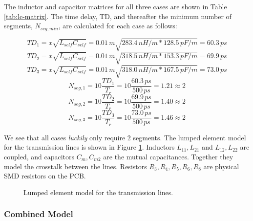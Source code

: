\documentclass[../main.tex]{subfiles}
\begin{document}
The inductor and capacitor matrices for all three cases are shown in Table \ref{tab:lc-matrix}. The time delay, TD, and thereafter the minimum number of segments, $N_{seg, min}$, are calculated for each case as follows:

\begin{equation*}
    TD_1 = x \sqrt{L_{self} C_{self}} = 0.01\,\si{m} \sqrt{283.4\,\si{nH/m} * 128.5\,\si{pF/m}} = 60.3\,\si{ps}
\end{equation*}
\begin{equation*}
    TD_2 = x \sqrt{L_{self} C_{self}} = 0.01\,\si{m} \sqrt{318.5\,\si{nH/m} * 153.3\,\si{pF/m}} = 69.9\,\si{ps}
\end{equation*}
\begin{equation*}
    TD_3 = x \sqrt{L_{self} C_{self}} = 0.01\,\si{m} \sqrt{318.0\,\si{nH/m} * 167.5\,\si{pF/m}} = 73.0\,\si{ps}
\end{equation*}
\begin{equation*}
    N_{seg,1} = 10 \frac{TD_1}{T_r} = 10 \frac{60.3\,\si{ps}}{500\,\si{ps}} = 1.21 \approx 2
\end{equation*}
\begin{equation*}
    N_{seg,2} = 10 \frac{TD_2}{T_r} = 10 \frac{69.9\,\si{ps}}{500\,\si{ps}} = 1.40 \approx 2
\end{equation*}
\begin{equation*}
    N_{seg,3} = 10 \frac{TD_3}{T_r} = 10 \frac{73.0\,\si{ps}}{500\,\si{ps}} = 1.46 \approx 2
\end{equation*}

We see that all cases \textit{luckily} only require 2 segments. The lumped element model for the transmission lines is shown in Figure \ref{fig:transmission-line}. Inductors $L_{11}, L_{21}$ and $L_{12}, L_{22}$ are coupled, and capacitors $C_{m}, C_{m2}$ are the mutual capacitances. Together they model the crosstalk between the lines. Resistors $R_3, R_4, R_5, R_6, R_8$ are physical SMD resistors on the PCB.

\begin{figure}[h]
    \centering
    \caption{Lumped element model for the transmission lines.}
    \label{fig:transmission-line}
\end{figure}

\subsubsection{Combined Model}
\end{document}
